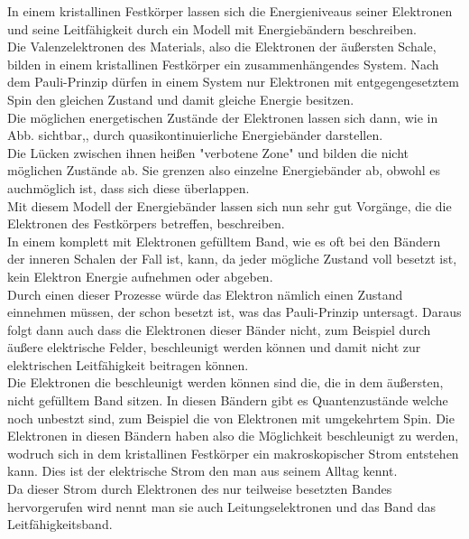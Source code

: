 In einem kristallinen Festkörper lassen sich die Energieniveaus seiner Elektronen und seine Leitfähigkeit durch
ein Modell mit Energiebändern beschreiben.\\
Die Valenzelektronen des Materials, also die Elektronen der äußersten Schale, 
bilden in einem kristallinen Festkörper ein zusammenhängendes System. Nach dem Pauli-Prinzip dürfen in einem System nur Elektronen mit entgegengesetztem Spin
den gleichen Zustand und damit gleiche Energie besitzen.\\
Die möglichen energetischen Zustände der Elektronen lassen sich dann, wie in Abb. sichtbar,, 
durch quasikontinuierliche Energiebänder darstellen.\\
Die Lücken zwischen ihnen heißen "verbotene Zone" und bilden die nicht möglichen Zustände ab. Sie grenzen also einzelne Energiebänder ab, obwohl es auchmöglich ist, dass sich diese überlappen.\\
Mit diesem Modell der Energiebänder lassen sich nun sehr gut Vorgänge, die die Elektronen des Festkörpers betreffen, beschreiben.\\
In einem komplett mit Elektronen gefülltem Band, wie es oft bei den Bändern der inneren 
Schalen der Fall ist, kann, da jeder mögliche Zustand voll besetzt ist,
kein Elektron Energie aufnehmen oder abgeben. \\
Durch einen dieser Prozesse würde das Elektron nämlich einen Zustand einnehmen müssen, der schon besetzt ist, was das Pauli-Prinzip untersagt.
Daraus folgt dann auch dass die Elektronen dieser Bänder nicht, zum Beispiel durch äußere elektrische Felder, beschleunigt werden können 
und damit nicht zur elektrischen Leitfähigkeit beitragen können.\\
Die Elektronen die beschleunigt werden können sind die, die in dem äußersten, nicht gefülltem Band sitzen.
In diesen Bändern gibt es Quantenzustände welche noch unbestzt sind, zum Beispiel die von Elektronen mit umgekehrtem Spin.
Die Elektronen in diesen Bändern haben also die Möglichkeit beschleunigt zu werden, wodruch sich in dem kristallinen Festkörper
ein makroskopischer Strom entstehen kann. Dies ist der elektrische Strom den man aus seinem Alltag kennt.\\
Da dieser Strom durch Elektronen des nur teilweise besetzten Bandes hervorgerufen wird nennt man sie auch Leitungselektronen und das Band das Leitfähigkeitsband.\\\\



